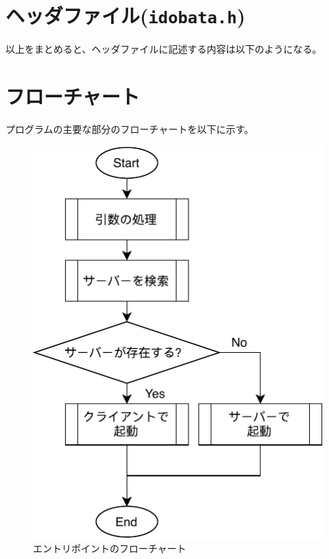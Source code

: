 \documentclass[uplatex,dvipdfmx,11pt,a4paper]{jsarticle} %
\begin{document}
\section{ヘッダファイル({\tt idobata.h})}
以上をまとめると、ヘッダファイルに記述する内容は以下のようになる。



\section{フローチャート}
プログラムの主要な部分のフローチャートを以下に示す。

\begin{figure}[H]
\centering
\includegraphics[]{figures/flow/1.pdf}
\caption{エントリポイントのフローチャート}
\label{fg:entry}
\end{figure}
\end{document}
